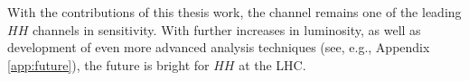 With the contributions of this thesis work, the \bbbb channel remains one of the leading $HH$ channels in sensitivity. With 
further increases in luminosity, as well as development of even more advanced analysis techniques 
(see, e.g., Appendix \ref{app:future}), the future is bright for $HH$ at the LHC. 